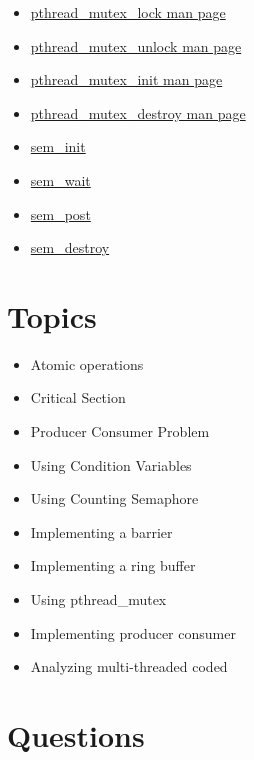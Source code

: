 \begin{itemize}
\item \href{http://linux.die.net/man/3/pthread_mutex_lock}{pthread\_mutex\_lock man page}
\item \href{http://linux.die.net/man/3/pthread_mutex_unlock}{pthread\_mutex\_unlock man page}
\item \href{http://linux.die.net/man/3/pthread_mutex_init}{pthread\_mutex\_init man page}
\item \href{http://linux.die.net/man/3/pthread_mutex_destroy}{pthread\_mutex\_destroy man page}
\item \href{http://man7.org/linux/man-pages/man3/sem_init.3.html}{sem\_init}
\item \href{http://man7.org/linux/man-pages/man3/sem_wait.3.html}{sem\_wait}
\item \href{http://man7.org/linux/man-pages/man3/sem_post.3.html}{sem\_post}
\item \href{http://man7.org/linux/man-pages/man3/sem_destroy.3.html}{sem\_destroy}
\end{itemize}


\section{Topics}

\begin{itemize}
\tightlist
\item
  Atomic operations
\item
  Critical Section
\item
  Producer Consumer Problem
\item
  Using Condition Variables
\item
  Using Counting Semaphore
\item
  Implementing a barrier
\item
  Implementing a ring buffer
\item
  Using pthread\_mutex
\item
  Implementing producer consumer
\item
  Analyzing multi-threaded coded
\end{itemize}

\section{Questions}

